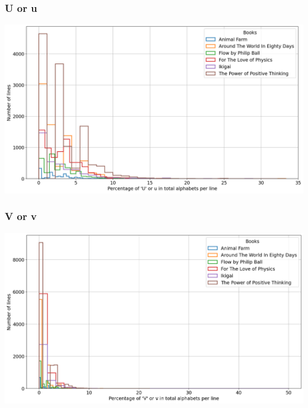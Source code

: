 \begin{frame}
    \frametitle{U or u}
    \begin{center}
        \hspace*{-5ex}
        \includegraphics[scale=0.35]{../01_programFiles/histograms/u.png}\hspace{10ex}
    \end{center}
\end{frame}

\begin{frame}
    \frametitle{V or v}
    \begin{center}
        \hspace*{-5ex}
        \includegraphics[scale=0.35]{../01_programFiles/histograms/v.png}\hspace{10ex}
    \end{center}
\end{frame}

